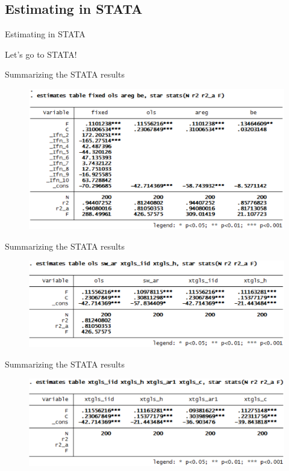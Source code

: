 \subsection{Estimating in STATA}

\begin{frame}{Estimating in STATA}
	\begin{center}
		\Huge{Let's go to STATA!}
	\end{center}
\end{frame}

\begin{frame}{Summarizing the STATA results}
		\begin{figure}
			\centering
			\includegraphics[width = 0.9\linewidth]{figures/panel_stata_01.png}
		\end{figure}
\end{frame}

\begin{frame}{Summarizing the STATA results}
		\begin{figure}
			\centering
			\includegraphics[width = \linewidth]{figures/panel_stata_02.png}
		\end{figure}
\end{frame}

\begin{frame}{Summarizing the STATA results}
		\begin{figure}
			\centering
			\includegraphics[width = \linewidth]{figures/panel_stata_03.png}
		\end{figure}
\end{frame}